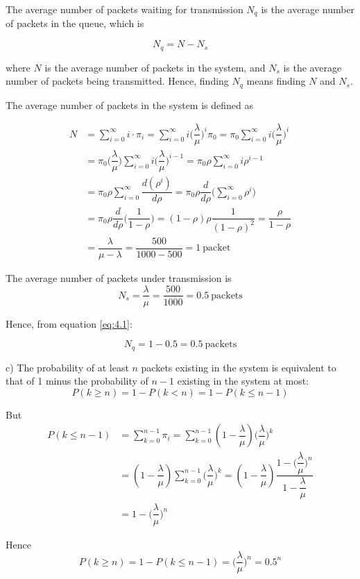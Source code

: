 The average number of packets waiting for transmission $N_q$ is the average
number of packets in the queue, which is

\begin{equation}
  N_q = N - N_s
  \label{eq:4.1}
\end{equation}

where $N$ is the average number of packets in the system, and $N_s$ is the
average number of packets being transmitted. Hence, finding $N_q$ means finding
$N$ and $N_s$.

The average number of packets in the system is defined as

\begin{align*}
  N &= \sum_{i=0}^{\infty} i \cdot \pi_i = \sum_{i=0}^{\infty} i \Big(\dfrac{\lambda}{\mu}\Big)^i \pi_0 =
  \pi_0 \sum_{i=0}^{\infty} i \Big(\dfrac{\lambda}{\mu}\Big)^i \\
  ~ &= \pi_0 \Big(\dfrac{\lambda}{\mu}\Big) \sum_{i=0}^{\infty} i \Big(\dfrac{\lambda}{\mu}\Big)^{i-1} =
  \pi_0 \rho \sum_{i=0}^{\infty} i \rho^{i-1} \\
  ~ &= \pi_0 \rho \sum_{i=0}^{\infty} \dfrac{d(\rho^i)}{d\rho} = \pi_0 \rho \dfrac{d}{d\rho} \Big(\sum_{i=0}^{\infty} \rho^i \Big) \\
  ~ &= \pi_0 \rho \dfrac{d}{d\rho} \Big(\dfrac{1}{1-\rho}\Big) = (1-\rho) \rho \dfrac{1}{(1-\rho)^2} = \dfrac{\rho}{1-\rho} \\
  ~ &= \dfrac{\lambda}{\mu - \lambda} = \dfrac{500}{1000-500} = 1\ \text{packet}
\end{align*}

The average number of packets under transmission is
$$N_s = \dfrac{\lambda}{\mu} = \dfrac{500}{1000} = 0.5\ \text{packets}$$

Hence, from equation \ref{eq:4.1}:

$$N_q = 1 - 0.5 = 0.5\ \text{packets}$$

c)
The probability of at least $n$ packets existing in the system is equivalent to
that of 1 minus the probability of $n-1$ existing in the system at most:
$$P(k \geq n) = 1 - P(k < n) = 1 - P(k \leq n-1)$$

But
\begin{align*}
  P(k \leq n-1) &= \sum_{k=0}^{n-1} \pi_i = \sum_{k=0}^{n-1} (1-\dfrac{\lambda}{\mu})\Big(\dfrac{\lambda}{\mu}\Big)^k \\
  ~             &= (1-\dfrac{\lambda}{\mu})\sum_{k=0}^{n-1} \Big(\dfrac{\lambda}{\mu}\Big)^k =
                   (1-\dfrac{\lambda}{\mu}) \dfrac{1-\Big(\dfrac{\lambda}{\mu}\Big)^n}{1-\dfrac{\lambda}{\mu}} \\
  ~             &= 1-\Big(\dfrac{\lambda}{\mu}\Big)^n
\end{align*}

Hence
$$P(k \geq n) = 1 - P(k \leq n-1) = \Big(\dfrac{\lambda}{\mu}\Big)^n = 0.5^n$$
